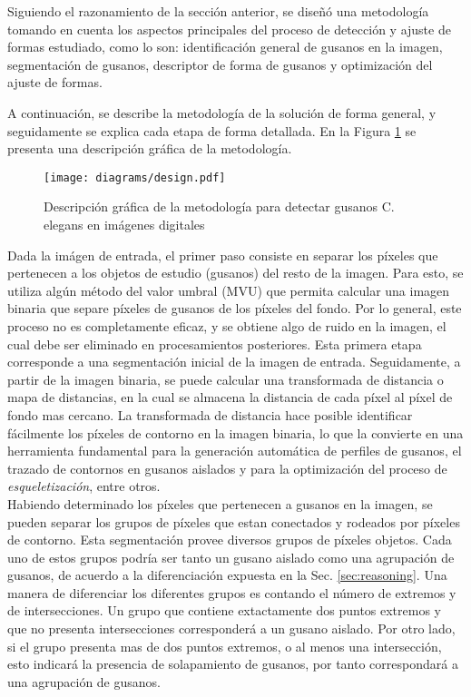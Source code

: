 Siguiendo el razonamiento de la secci\'on anterior, se dise\~n\'o una metodolog\'ia tomando en cuenta
los aspectos principales del proceso de detecci\'on y ajuste de formas estudiado, como lo son:
identificaci\'on general de gusanos en la imagen, segmentaci\'on de gusanos, 
descriptor de forma de gusanos y optimizaci\'on del ajuste de formas.

A continuaci\'on, se describe la metodolog\'ia de la soluci\'on de forma general,  y
seguidamente se explica cada etapa de forma detallada.
En la Figura \ref{fig:methsol} se presenta una descripci\'on gr\'afica de la metodolog\'ia.\\

\begin{figure}[h t b p ! H]
 \centering
   \texttt{[image: diagrams/design.pdf]}
 \caption{Descripci\'on gr\'afica de la metodolog\'ia para detectar gusanos C. elegans
   en im\'agenes digitales}
\label{fig:methsol}
\end{figure}

Dada la im\'agen de entrada, el primer paso consiste en separar los p\'ixeles que
pertenecen a los objetos de estudio (gusanos) del resto de la imagen. Para esto,
se utiliza alg\'un m\'etodo del valor umbral (MVU) que permita calcular una imagen
binaria que separe p\'ixeles de gusanos de los p\'ixeles del fondo. Por lo general,
este proceso no es completamente eficaz, y se obtiene algo de ruido en la imagen, el
cual debe ser eliminado en procesamientos posteriores. Esta primera etapa corresponde
a una segmentaci\'on inicial de la imagen de entrada.
Seguidamente, a partir de la imagen binaria, se puede calcular una transformada de
distancia o mapa de distancias, en la cual se almacena la distancia de cada p\'ixel
al p\'ixel de fondo mas cercano. La transformada de distancia hace posible identificar
f\'acilmente los p\'ixeles de contorno en la imagen binaria, lo que la convierte en
una herramienta fundamental para la generaci\'on autom\'atica de perfiles de gusanos,
el trazado de contornos en gusanos aislados y para la optimizaci\'on del proceso
de \emph{esqueletizaci\'on}, entre otros. \\

Habiendo determinado los p\'ixeles que pertenecen a gusanos en la imagen, se pueden separar
los grupos de p\'ixeles que estan conectados y rodeados por p\'ixeles de contorno. Esta
segmentaci\'on provee diversos grupos de p\'ixeles objetos. Cada uno de estos grupos
podr\'ia ser tanto un gusano aislado como una agrupaci\'on de gusanos, de acuerdo a la diferenciaci\'on
expuesta en la Sec. \ref{sec:reasoning}.
Una manera de diferenciar los diferentes grupos es contando el n\'umero de extremos y de intersecciones. 
Un grupo que contiene extactamente dos puntos extremos y que
no presenta intersecciones corresponder\'a a un gusano aislado. Por otro lado, si el grupo presenta
mas de dos puntos extremos, o al menos una intersecci\'on, esto indicar\'a la presencia de 
solapamiento de gusanos, por tanto correspondar\'a a una agrupaci\'on de gusanos.\\

